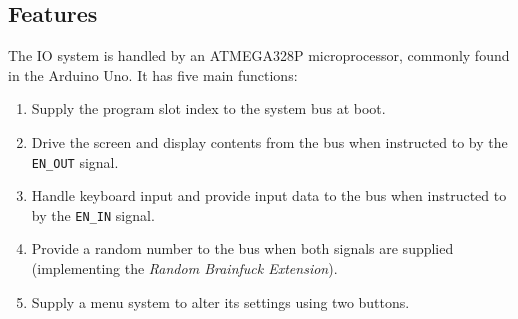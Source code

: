 \subsection{Features}
The IO system is handled by an ATMEGA328P microprocessor, commonly found in the Arduino Uno. It has five main functions:
\begin{enumerate}
\item Supply the program slot index to the system bus at boot.
\item Drive the screen and display contents from the bus when instructed to by the \texttt{EN\_OUT} signal.
\item Handle keyboard input and provide input data to the bus when instructed to by the \texttt{EN\_IN} signal.
\item Provide a random number to the bus when both signals are supplied (implementing the \emph{Random Brainfuck Extension}).
\item Supply a menu system to alter its settings using two buttons.
\end{enumerate}

